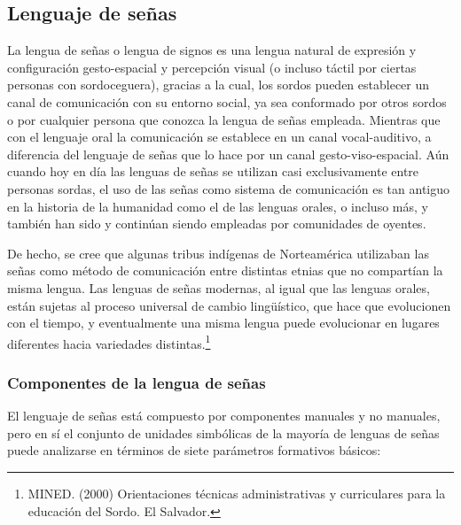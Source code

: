 \documentclass[12pt]{report}%
\begin{document}
\subsection{Lenguaje de señas}

La lengua de señas o lengua de signos es una lengua natural de expresión y configuración gesto-espacial y percepción visual (o incluso táctil por ciertas personas con sordoceguera), gracias a la cual, los sordos pueden establecer un canal de comunicación con su entorno social, ya sea conformado por otros sordos o por cualquier persona que conozca la lengua de señas empleada. Mientras que con el lenguaje oral la comunicación se establece en un canal vocal-auditivo, a diferencia del lenguaje de señas que lo hace por un canal gesto-viso-espacial.
Aún cuando hoy en día las lenguas de señas se utilizan casi exclusivamente entre personas sordas, el uso de las señas como sistema de comunicación es tan antiguo en la historia de la humanidad como el de las lenguas orales, o incluso más, y también han sido y continúan siendo empleadas por comunidades de oyentes.

De hecho, se cree que algunas tribus indígenas de Norteamérica utilizaban las señas como \newpage método de comunicación entre distintas etnias que no compartían la misma lengua.
Las lenguas de señas modernas, al igual que las lenguas orales, están sujetas al proceso universal de cambio lingüístico, que hace que evolucionen con el tiempo, y eventualmente una misma lengua puede evolucionar en lugares diferentes hacia variedades distintas.\footnote{MINED. (2000) Orientaciones técnicas administrativas y curriculares para la educación del Sordo. El Salvador.}

\subsubsection{Componentes de la lengua de señas}
El lenguaje de señas está compuesto por componentes manuales y no manuales, pero en sí el conjunto de unidades simbólicas de la mayoría de lenguas de señas puede analizarse en términos de siete parámetros formativos básicos:
\end{document}
